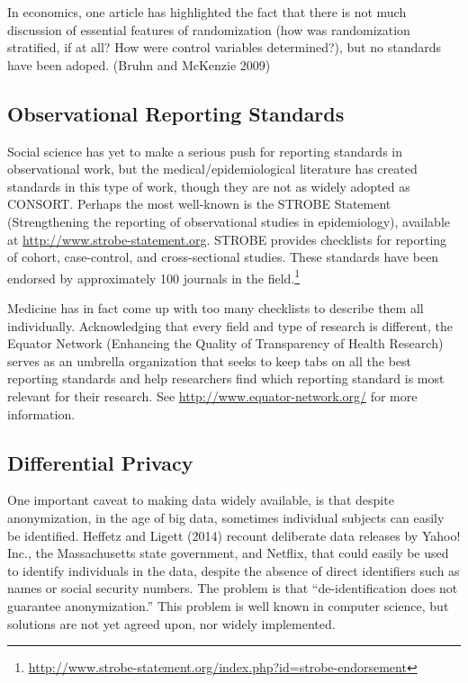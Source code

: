 \documentclass[12pt] {article}
\begin{document}
In economics, one article has highlighted the fact that there is not much discussion of essential features of randomization (how was randomization stratified, if at all? How were control variables determined?), but no standards have been adoped. (Bruhn and
McKenzie 2009)

\subsection{Observational Reporting Standards}\label{observational-standards}
Social science has yet to make a serious push for reporting standards in observational work, but the medical/epidemiological literature has created standards in this type of work, though they are not as widely adopted as CONSORT. Perhaps the most well-known is the STROBE Statement (Strengthening the reporting of observational studies in epidemiology), available at \url{http://www.strobe-statement.org}. STROBE provides checklists for reporting of cohort, case-control, and cross-sectional studies. These standards have been endorsed by approximately 100 journals in the field.\footnote{\url{http://www.strobe-statement.org/index.php?id=strobe-endorsement}}

Medicine has in fact come up with too many checklists to describe them all individually. Acknowledging that every field and type of research is different, the Equator Network (Enhancing the Quality of Transparency of Health Research) serves as an umbrella organization that seeks to keep tabs on all the best reporting standards and help researchers find which reporting standard is most relevant for their research. See \url{http://www.equator-network.org/} for more information.



\subsection{Differential Privacy}\label{differential-privacy}

One important caveat to making data widely available, is that despite
anonymization, in the age of big data, sometimes individual subjects can
easily be identified. Heffetz and Ligett (2014) recount deliberate data
releases by Yahoo! Inc., the Massachusetts state government, and
Netflix, that could easily be used to identify individuals in the data,
despite the absence of direct identifiers such as names or social
security numbers. The problem is that ``de-identification does not
guarantee anonymization.'' This problem is well known in computer science, but solutions are not yet agreed upon, nor widely implemented.
\end{document}
